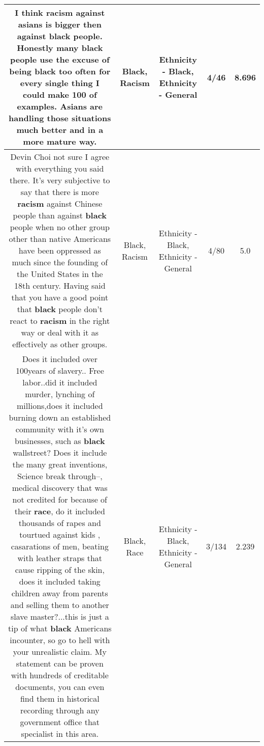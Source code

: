 \documentclass[11pt]{article}
\newlength\mylength
\begin{document}
\begin{center}
\begin{longtable}{|C{.65\mylength}|C{.30\mylength}|C{.12\mylength}|C{.12\mylength}|C{.12\mylength}|}
  \small I think \textbf{racism} against asians is bigger then against \textbf{black} people. Honestly many \textbf{black} people use the excuse of being \textbf{black} too often for every single thing I could make 100 of examples. Asians are handling those situations much better and in a more mature way.\normalsize   & Black, Racism & Ethnicity - Black, Ethnicity - General & 4/46 & 8.696 \\  \hline
  \small Devin Choi not sure I agree with everything you said there. It's very subjective to say that there is more \textbf{racism} against Chinese people than against \textbf{black} people when no other group other than native Americans have been oppressed as much since the founding of the United States in the 18th century. Having said that you have a good point that \textbf{black} people don't react to \textbf{racism} in the right way or deal with it as effectively as other groups.\normalsize   & Black, Racism & Ethnicity - Black, Ethnicity - General & 4/80 & 5.0 \\  \hline
  \small Does it included over 100years of slavery.. Free labor..did it included murder, lynching of millions,does it included burning down an established community with it's own businesses, such as \textbf{black} wallstreet? Does it include the many great inventions, Science break through--, medical discovery that was not credited for because of their \textbf{race}, do it included thousands of rapes and tourtued against kids , casarations of men, beating with leather straps that cause ripping of the skin, does it included taking children away from parents and selling them to another slave master?...this is just a tip of what \textbf{black} Americans incounter, so go to hell with your unrealistic claim. My statement can be proven with hundreds of creditable    documents, you can even find them in historical recording through any government office that specialist in this area.\normalsize   & Black, Race & Ethnicity - Black, Ethnicity - General & 3/134 & 2.239 \\  \hline

\end{longtable}
\end{center}
\end{document}
